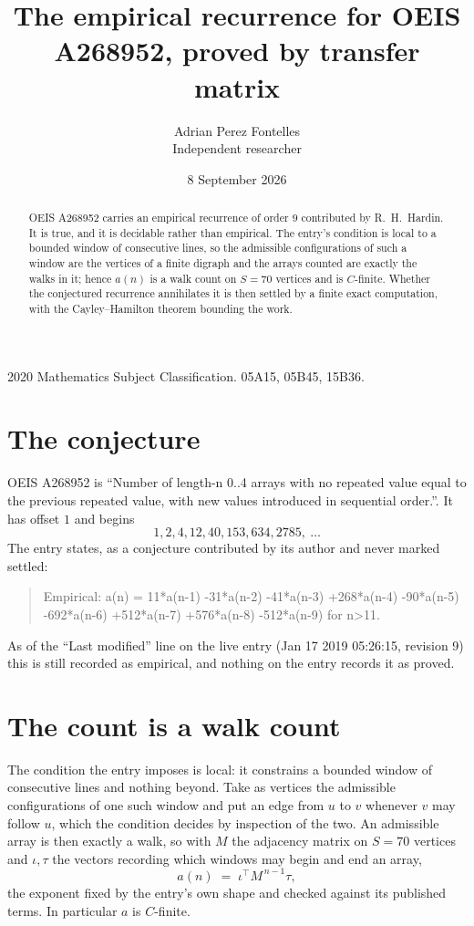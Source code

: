 \documentclass[11pt,a4paper]{article}
\title{The empirical recurrence for OEIS A268952, proved by transfer matrix}
\author{Adrian Perez Fontelles\\ \small Independent researcher}
\date{8 September 2026}
\theoremstyle{plain}
\theoremstyle{definition}
\begin{document}
\maketitle

\begin{abstract}
OEIS A268952 carries an empirical recurrence of order $9$ contributed by R.~H.~Hardin. It is
true, and it is decidable rather than empirical. The entry's condition is local to a bounded window of consecutive lines, so
the admissible configurations of such a window are the vertices of a finite digraph and the
arrays counted are exactly the walks in it; hence $a(n)$ is a walk count on $S=70$ vertices
and is $C$-finite. Whether the conjectured recurrence annihilates it is then settled by a
finite exact computation, with the Cayley--Hamilton theorem bounding the work.
\end{abstract}

\noindent\small 2020 Mathematics Subject Classification. 05A15, 05B45, 15B36.\normalsize

\section{The conjecture}

OEIS A268952 is ``Number of length-n 0..4 arrays with no repeated value equal to the previous repeated value, with new values introduced in sequential order.''. It has offset $1$ and begins
\[
1, 2, 4, 12, 40, 153, 634, 2785,\ \dots
\]
The entry states, as a conjecture contributed by its author and never marked settled:
\begin{quote}
Empirical: a(n) = 11*a(n-1) -31*a(n-2) -41*a(n-3) +268*a(n-4) -90*a(n-5) -692*a(n-6) +512*a(n-7) +576*a(n-8) -512*a(n-9) for n>11.
\end{quote}
As of the ``Last modified'' line on the live entry (Jan 17 2019 05:26:15, revision 9) this is still
recorded as empirical, and nothing on the entry records it as proved.

\section{The count is a walk count}

The condition the entry imposes is local: it constrains a bounded window of consecutive lines and nothing beyond. Take as
vertices the admissible configurations of one such window and put an edge from $u$ to $v$
whenever $v$ may follow $u$, which the condition decides by inspection of the two. An
admissible array is then exactly a walk, so with $M$ the adjacency matrix on $S=70$ vertices
and $\iota,\tau$ the vectors recording which windows may begin and end an array,
\[
a(n)\;=\;\iota^{\!\top}M^{\,n-1}\tau ,
\]
the exponent fixed by the entry's own shape and checked against its published terms. In
particular $a$ is $C$-finite.
\end{document}
